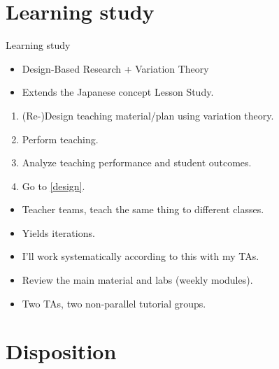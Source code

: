 \section{Learning study}

\begin{frame}
  \begin{block}{Learning study~\cite{LearningStudy}}
    \begin{itemize}
      \item Design-Based Research + Variation Theory
      \item Extends the Japanese concept Lesson Study.
    \end{itemize}
    \pause
    \begin{enumerate}
      \item \label{design} (Re-)Design teaching material/plan using variation 
        theory.
      \item Perform teaching.
      \item Analyze teaching performance and student outcomes.
      \item Go to \ref{design}.
    \end{enumerate}
  \end{block}

  \pause

  \begin{remark}
    \begin{itemize}
      \item Teacher teams, teach the same thing to different classes.
      \item Yields iterations.
    \end{itemize}
  \end{remark}
\end{frame}

\begin{frame}
  \begin{example}
    \begin{itemize}
      \item I'll work systematically according to this with my TAs.
      \item Review the main material and labs (weekly modules).
      \item Two TAs, two non-parallel tutorial groups.
    \end{itemize}
  \end{example}
\end{frame}


\section{Disposition}

